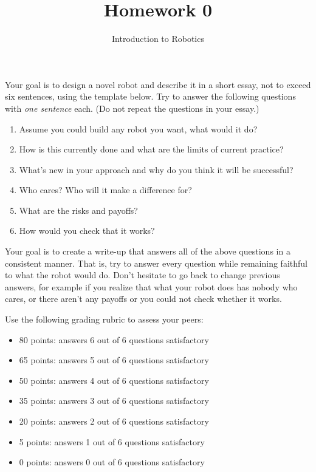\documentclass[letter,twoside,11pt]{article}
\begin{document}
\title{Homework 0}
\author{Introduction to Robotics}
\date{} %
\maketitle

Your goal is to design a novel robot and describe it in a short essay, not to exceed six sentences, using the template below. Try to answer the following questions with \emph{one sentence} each. (Do not repeat the questions in your essay.)

\begin{enumerate}
\item Assume you could build any robot you want, what would it do?
\item How is this currently done and what are the limits of current practice?
\item What's new in your approach and why do you think it will be successful?
\item Who cares? Who will it make a difference for? 
\item What are the risks and payoffs?
\item How would you check that it works? 
\end{enumerate}

Your goal is to create a write-up that answers all of the above questions in a consistent manner. That is, try to answer every question while remaining faithful to what the robot would do. Don't hesitate to go back to change previous answers, for example if you realize that what your robot does has nobody who cares, or there aren't any payoffs or you could not check whether it works. 

Use the following grading rubric to assess your peers:

\begin{itemize}
\item 80 points: answers 6 out of 6 questions satisfactory
\item 65 points: answers 5 out of 6 questions satisfactory
\item 50 points: answers 4 out of 6 questions satisfactory
\item 35 points: answers 3 out of 6 questions satisfactory
\item 20 points: answers 2 out of 6 questions satisfactory
\item 5 points: answers 1 out of 6 questions satisfactory
\item 0 points: answers 0 out of 6 questions satisfactory
\end{itemize}
\end{document}

